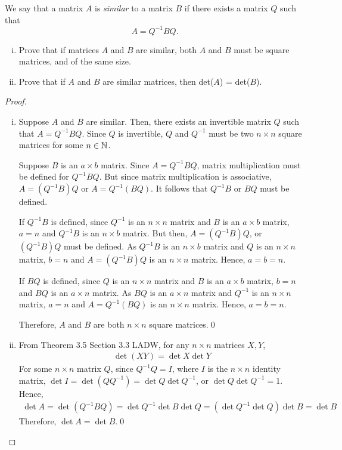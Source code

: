 \begin{question}
	\normalfont We say that a matrix $A$ is \emph{similar} to a matrix $B$ if there exists a matrix $Q$ such that 
	\[
	A = Q^{-1}BQ.
	\]
	\begin{enumerate}[(i)]
	\item Prove that if matrices $A$ and $B$ are similar, both $A$ and $B$ must be square matrices, and of the same size. 
	\vspace{.1cm}	
\item	Prove that if $A$ and $B$ are similar matrices, then det($A$) = det($B$). 
	\end{enumerate}	
	\end{question}
\begin{proof}
	\renewcommand{\qedsymbol}{$\blacksquare$}
	\begin{enumerate}[(i)]
		\item Suppose $A$ and $B$ are similar.
		Then, there exists an invertible matrix $Q$ such that $A=Q^{-1}BQ$.
		Since $Q$ is invertible, $Q$ and $Q^{-1}$ must be two $n\times n$ square matrices for some $n\in\mathbb N$.
        
		Suppose $B$ is an $a\times b$ matrix.
        Since $A=Q^{-1}BQ$, matrix multiplication must be defined for $Q^{-1}BQ$.
        But since matrix multiplication is associative, $A=(Q^{-1}B)Q$ or $A=Q^{-1}(BQ)$.
        It follows that $Q^{-1}B$ or $BQ$ must be defined.

        If $Q^{-1}B$ is defined, since $Q^{-1}$ is an $n\times n$ matrix and $B$ is an $a\times b$ matrix, $a=n$ and $Q^{-1}B$ is an $n\times b$ matrix.
        But then, $A=(Q^{-1}B)Q$, or $(Q^{-1}B)Q$ must be defined.
        As $Q^{-1}B$ is an $n\times b$ matrix and $Q$ is an $n\times n$ matrix, $b=n$ and $A=(Q^{-1}B)Q$ is an $n\times n$ matrix.
        Hence, $a=b=n$.

        If $BQ$ is defined, since $Q$ is an $n\times n$ matrix and $B$ is an $a\times b$ matrix, $b=n$ and $BQ$ is an $a\times n$ matrix.
        As $BQ$ is an $a\times n$ matrix and $Q^{-1}$ is an $n\times n$ matrix, $a=n$ and $A=Q^{-1}(BQ)$ is an $n\times n$ matrix.
        Hence, $a=b=n$.

        Therefore, $A$ and $B$ are both $n\times n$ square matrices.\qed
        \item From Theorem 3.5 Section 3.3 LADW, for any $n\times n$ matrices $X,Y$,
        \[
            \begin{aligned}
                \det(XY)=\det X\det Y
            \end{aligned}
        \]
        For some $n\times n$ matrix $Q$, since $Q^{-1}Q=I$, where $I$ is the $n\times n$ identity matrix, $\det I=\det(QQ^{-1})=\det Q\det Q^{-1}$, or $\det Q\det Q^{-1}=1$.
        Hence, 
        \[
            \begin{aligned}
                \det A=\det(Q^{-1}BQ)=\det Q^{-1}\det B\det Q=(\det Q^{-1}\det Q)\det B=\det B
            \end{aligned}
        \]
        Therefore, $\det A=\det B$.\qed
     	\end{enumerate}
	\renewcommand{\qedsymbol}{}
\end{proof}